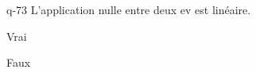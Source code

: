 \begin{truefalse}{q-73}
L'application nulle entre deux ev est linéaire.
\item* Vrai
\item Faux
\end{truefalse}

